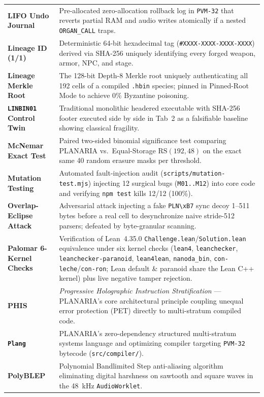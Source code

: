 \documentclass[10pt,letterpaper]{article}
\begin{document}
{\begin{longtable}{@{} L{3.9cm} L{13.1cm} @{}}
\textbf{LIFO Undo Journal} & Pre-allocated zero-allocation rollback log in \texttt{PVM-32} that reverts partial RAM and audio writes atomically if a nested \texttt{ORGAN\_CALL} traps. \\
\textbf{Lineage ID (1/1)} & Deterministic 64-bit hexadecimal tag (\texttt{\#XXXX-XXXX-XXXX-XXXX}) derived via SHA-256 uniquely identifying every forged weapon, armor, NPC, and stage. \\
\textbf{Lineage Merkle Root} & The 128-bit Depth-8 Merkle root uniquely authenticating all 192 cells of a compiled \texttt{.hbin} species; pinned in Pinned-Root Mode to achieve 0\% Byzantine poisoning. \\
\textbf{\texttt{LINBIN01} Control Twin} & Traditional monolithic headered executable with SHA-256 footer executed side by side in Tab~2 as a falsifiable baseline showing classical fragility. \\
\textbf{McNemar Exact Test} & Paired two-sided binomial significance test comparing PLANARIA vs.\ Equal-Storage $\mathrm{RS}(192,48)$ on the exact same 40 random erasure masks per threshold. \\
\textbf{Mutation Testing} & Automated fault-injection audit (\texttt{scripts/mutation-test.mjs}) injecting 12 surgical bugs (\texttt{M01..M12}) into core code and verifying \texttt{npm test} kills 12/12 (100\%). \\
\textbf{Overlap-Eclipse Attack} & Adversarial attack injecting a fake \texttt{PLN\textbackslash xB7} sync decoy 1--511 bytes before a real cell to desynchronize naive stride-512 parsers; defeated by byte-granular scanning. \\
\textbf{Palomar 6-Kernel Checks} & Verification of Lean~4.35.0 \texttt{Challenge.lean}/\texttt{Solution.lean} equivalence under six kernel checks (\texttt{lean4}, \texttt{leanchecker}, \texttt{leanchecker-paranoid}, \texttt{lean4lean}, \texttt{nanoda\_bin}, \texttt{con-leche}/\texttt{con-ron}; Lean default \& paranoid share the Lean C++ kernel) plus live negative tamper rejection. \\
\textbf{PHIS} & \emph{Progressive Holographic Instruction Stratification} --- PLANARIA's core architectural principle coupling unequal error protection (PET) directly to multi-stratum compiled code. \\
\textbf{\texttt{Plang}} & PLANARIA's zero-dependency structured multi-stratum systems language and optimizing compiler targeting \texttt{PVM-32} bytecode (\texttt{src/compiler/}). \\
\textbf{PolyBLEP} & Polynomial Bandlimited Step anti-aliasing algorithm eliminating digital harshness on sawtooth and square waves in the 48~kHz \texttt{AudioWorklet}. \\

\end{longtable}}
\end{document}
